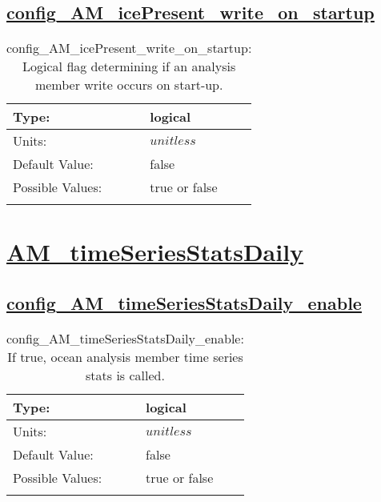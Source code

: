 \subsection[config\_AM\_icePresent\_write\_on\_startup]{\hyperref[sec:nm_tab_AM_icePresent]{config\_AM\_icePresent\_write\_on\_startup}}
\label{subsec:nm_sec_config_AM_icePresent_write_on_startup}
\begin{center}
\begin{longtable}{| p{2.0in} || p{4.0in} |}
    \hline
    Type: & logical \\
    \hline
    Units: & $unitless$ \\
    \hline
    Default Value: & false \\
    \hline
    Possible Values: & true or false \\
    \hline
    \caption{config\_AM\_icePresent\_write\_on\_startup: Logical flag determining if an analysis member write occurs on start-up.}
\end{longtable}
\end{center}
\section[AM\_timeSeriesStatsDaily]{\hyperref[sec:nm_tab_AM_timeSeriesStatsDaily]{AM\_timeSeriesStatsDaily}}
\label{sec:nm_sec_AM_timeSeriesStatsDaily}
\subsection[config\_AM\_timeSeriesStatsDaily\_enable]{\hyperref[sec:nm_tab_AM_timeSeriesStatsDaily]{config\_AM\_timeSeriesStatsDaily\_enable}}
\label{subsec:nm_sec_config_AM_timeSeriesStatsDaily_enable}
\begin{center}
\begin{longtable}{| p{2.0in} || p{4.0in} |}
    \hline
    Type: & logical \\
    \hline
    Units: & $unitless$ \\
    \hline
    Default Value: & false \\
    \hline
    Possible Values: & true or false \\
    \hline
    \caption{config\_AM\_timeSeriesStatsDaily\_enable: If true, ocean analysis member time series stats is called.}
\end{longtable}
\end{center}
